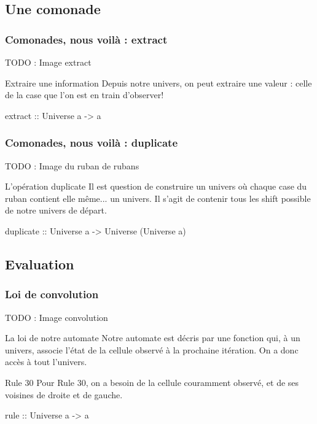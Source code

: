 \documentclass{beamer}
\begin{document}
\subsection{Une comonade}
\begin{frame}
\frametitle{Comonades, nous voilà : extract}

TODO : Image extract
\begin{block}{Extraire une information}
Depuis notre univers, on peut extraire une valeur : celle de la case que l'on est en train d'observer!

\end{block}
\begin{block}{}
extract :: Universe a -> a
\end{block}
\end{frame}

\begin{frame}
\frametitle{Comonades, nous voilà : duplicate}
TODO : Image du ruban de rubans

\begin{block}{L'opération duplicate}
Il est question de construire un univers où chaque case du ruban contient elle même... un univers. Il s'agit de contenir tous les shift possible de notre univers de départ.
\end{block}

\begin{block}{}
duplicate :: Universe a -> Universe (Universe a)
\end{block}
\end{frame}

\subsection{Evaluation}

\begin{frame}
\frametitle{Loi de convolution}
TODO : Image convolution
\begin{block}{La loi de notre automate}
Notre automate est décris par une fonction qui, à un univers, associe l'état de la cellule observé à la prochaine itération. On a donc accès à tout l'univers.
\end{block}
\pause
\begin{block}{Rule 30}
Pour Rule 30, on a besoin de la cellule couramment observé, et de ses voisines de droite et de gauche.
\end{block}
\pause
\begin{exampleblock}{}
rule :: Universe a -> a
\end{exampleblock}
\end{frame}
\end{document}

